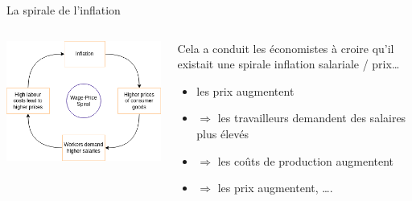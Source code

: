 \documentclass[
  ignorenonframetext,
  aspectratio=169,
]{beamer}
\providecommand{\tightlist}{%
  \setlength{\itemsep}{0pt}\setlength{\parskip}{0pt}}\usepackage{longtable,booktabs,array}
\begin{document}
\begin{frame}{La spirale de l'inflation}
\label{la-spirale-de-linflation}
\begin{columns}[T]
\begin{column}{0.48\textwidth}
\includegraphics[width=1\textwidth,height=\textheight]{assets/spiral_diagram.png}
\end{column}

\begin{column}{0.48\textwidth}
Cela a conduit les économistes à croire qu'il existait une spirale
inflation salariale / prix\ldots{}

\begin{itemize}
\tightlist
\item
  les prix augmentent
\item
  \(\Rightarrow\) les travailleurs demandent des salaires plus élevés
\item
  \(\Rightarrow\) les coûts de production augmentent
\item
  \(\Rightarrow\) les prix augmentent, \ldots.
\end{itemize}
\end{column}
\end{columns}
\end{frame}
\end{document}
